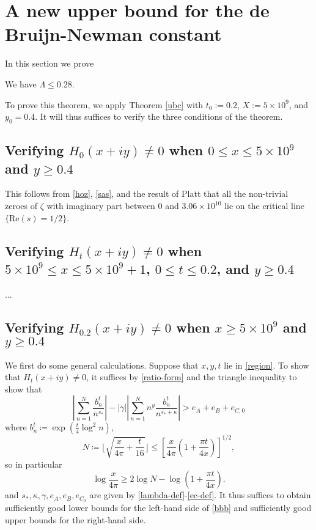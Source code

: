\section{A new upper bound for the de Bruijn-Newman constant}

In this section we prove

\begin{theorem}  We have $\Lambda \leq 0.28$.
\end{theorem}

To prove this theorem, we apply Theorem \ref{ubc} with $t_0 := 0.2$, $X := 5 \times 10^9$, and $y_0 = 0.4$.  It will thus suffices to verify the three conditions of the theorem.

\subsection{Verifying $H_0(x+iy) \neq 0$ when $0 \leq x \leq 5 \times 10^9$ and $y \geq 0.4$}

This follows from \eqref{hoz}, \eqref{sas}, and the result of Platt that all the non-trivial zeroes of $\zeta$ with imaginary part between $0$ and
 $3.06 \times 10^{10}$ lie on the critical line $\{ \mathrm{Re}(s) = 1/2\}$.

\subsection{Verifying $H_t(x+iy) \neq 0$ when $5 \times 10^9 \leq x \leq 5 \times 10^9+1$, $0 \leq t \leq 0.2$, and $y \geq 0.4$}

...

\subsection{Verifying $H_{0.2}(x+iy) \neq 0$ when $x \geq 5 \times 10^9$ and $y \geq 0.4$}

We first do some general calculations.  Suppose that $x,y,t$ lie in \eqref{region}.  To show that $H_t(x+iy) \neq 0$, it suffices by \eqref{ratio-form} and the triangle inequality to show that
\begin{equation}\label{bbb}
\left|\sum_{n=1}^N \frac{b_n^t}{n^{s_*}}\right| - |\gamma| \left|\sum_{n=1}^N n^y \frac{b_n^t}{n^{\overline{s_*} + \kappa}}\right| > e_A + e_B + e_{C,0} 
\end{equation}
where $b_n^t \coloneqq \exp( \frac{t}{4} \log^2 n)$,
$$ N \coloneqq \lfloor \sqrt{\frac{x}{4\pi} + \frac{t}{16}} \rfloor \leq [\frac{x}{4\pi} (1 + \frac{\pi t}{4x})]^{1/2},$$
so in particular
\begin{equation}\label{logx}
 \log \frac{x}{4\pi} \geq 2 \log N - \log(1 + \frac{\pi t}{4x}).
\end{equation}
and $s_*, \kappa, \gamma, e_A, e_B, e_{C_0}$ are given by \eqref{lambda-def}-\eqref{ec-def}.  It thus suffices to obtain sufficiently good lower bounds for the left-hand side of \eqref{bbb} and sufficiently good upper bounds for the right-hand side.

